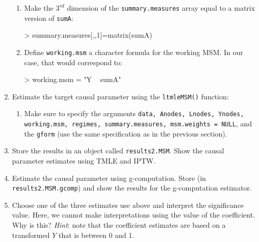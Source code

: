 \documentclass[answers]{exam}
\begin{document}
\begin{enumerate}
\begin{enumerate}
\item Make the $3^{rd}$ dimension of the \texttt{summary.measures} array equal to a matrix version of \texttt{sumA}:
\begin{Schunk}
\begin{Sinput}
> summary.measures[,,1]=matrix(sumA)
\end{Sinput}
\end{Schunk}
\item Define \texttt{working.msm} a character formula for the working MSM. In our case, that would correspond to:
\begin{Schunk}
\begin{Sinput}
> working.msm = "Y ~ sumA"
\end{Sinput}
\end{Schunk}
\end{enumerate}
\item Estimate the target causal parameter using the \texttt{ltmleMSM()} function:
\begin{enumerate}
\item Make sure to specify the arguments \texttt{data, Anodes, Lnodes, Ynodes, working.msm, regimes, summary.measures, msm.weights = NULL}, and the \texttt{gform} (use the same specification as in the previous section).
\end{enumerate}
\item Store the results in an object called \texttt{results2.MSM}. Show the causal parameter estimates using TMLE and IPTW.
\item Estimate the causal parameter using g-computation. Store (in \texttt{results2.MSM.gcomp}) and show the results for the g-computation estimator.
\item Choose one of the three estimates use above and interpret the significance value. Here, we cannot make interpretations using the value of the coefficient. Why is this? \textit{Hint}: note that the coefficient estimates are based on a transformed $Y$ that is between 0 and 1.
\end{enumerate}
\end{document}
